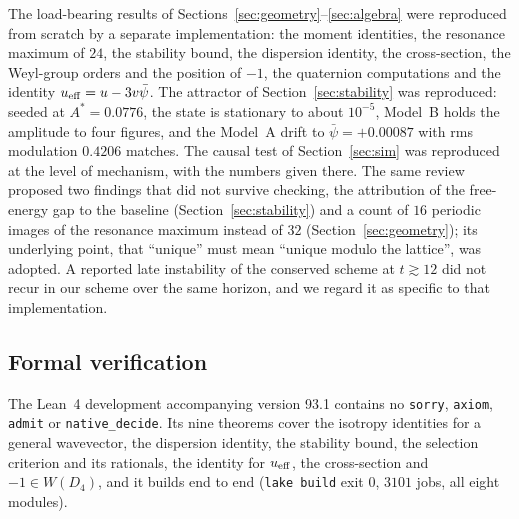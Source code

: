 \documentclass[a4paper,11pt]{article}
\numberwithin{equation}{section}
\theoremstyle{jsplain}
\theoremstyle{jsrem}
\begin{document}
The load-bearing results of Sections~\ref{sec:geometry}--\ref{sec:algebra} were reproduced from scratch by a separate implementation: the moment identities, the resonance maximum of $24$, the stability bound, the dispersion identity, the cross-section, the Weyl-group orders and the position of $-1$, the quaternion computations and the identity $u_{\rm eff}=u-3v\bar\psi$. The attractor of Section~\ref{sec:stability} was reproduced: seeded at $A^*=0.0776$, the state is stationary to about $10^{-5}$, Model~B holds the amplitude to four figures, and the Model~A drift to $\bar\psi=+0.00087$ with rms modulation $0.4206$ matches. The causal test of Section~\ref{sec:sim} was reproduced at the level of mechanism, with the numbers given there. The same review proposed two findings that did not survive checking, the attribution of the free-energy gap to the baseline (Section~\ref{sec:stability}) and a count of $16$ periodic images of the resonance maximum instead of $32$ (Section~\ref{sec:geometry}); its underlying point, that ``unique'' must mean ``unique modulo the lattice'', was adopted. A reported late instability of the conserved scheme at $t\gtrsim12$ did not recur in our scheme over the same horizon, and we regard it as specific to that implementation.

\subsection{Formal verification}

The Lean~4 development accompanying version 93.1 contains no \texttt{sorry}, \texttt{axiom}, \texttt{admit} or \texttt{native\_decide}. Its nine theorems cover the isotropy identities for a general wavevector, the dispersion identity, the stability bound, the selection criterion and its rationals, the identity for $u_{\rm eff}$, the cross-section and $-1\in W(D_4)$, and it builds end to end (\texttt{lake build} exit $0$, $3101$ jobs, all eight modules).
\end{document}
